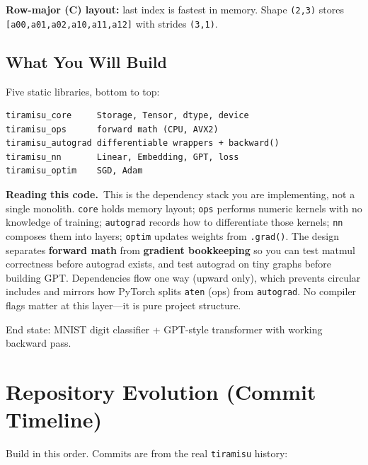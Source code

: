 \documentclass[11pt,a4paper]{article}
\newcommand{\explain}{\par\smallskip\noindent}
\newcommand{\exhead}{\textbf{Reading this code.}\ }
\begin{document}
\textbf{Row-major (C) layout:} last index is fastest in memory. Shape \texttt{(2,3)} stores
\texttt{[a00,a01,a02,a10,a11,a12]} with strides \texttt{(3,1)}.

\subsection{What You Will Build}

Five static libraries, bottom to top:
\begin{lstlisting}[style=plain]
tiramisu_core     Storage, Tensor, dtype, device
tiramisu_ops      forward math (CPU, AVX2)
tiramisu_autograd differentiable wrappers + backward()
tiramisu_nn       Linear, Embedding, GPT, loss
tiramisu_optim    SGD, Adam
\end{lstlisting}
\explain\exhead This is the dependency stack you are implementing, not a single monolith.
\texttt{core} holds memory layout; \texttt{ops} performs numeric kernels with no knowledge of
training; \texttt{autograd} records how to differentiate those kernels; \texttt{nn} composes
them into layers; \texttt{optim} updates weights from \texttt{.grad()}. The design separates
\textbf{forward math} from \textbf{gradient bookkeeping} so you can test matmul correctness
before autograd exists, and test autograd on tiny graphs before building GPT. Dependencies flow
one way (upward only), which prevents circular includes and mirrors how PyTorch splits
\texttt{aten} (ops) from \texttt{autograd}. No compiler flags matter at this layer---it is
pure project structure.

End state: MNIST digit classifier + GPT-style transformer with working backward pass.

\section{Repository Evolution (Commit Timeline)}
\label{sec:timeline}

Build in this order. Commits are from the real \texttt{tiramisu} history:
\end{document}
